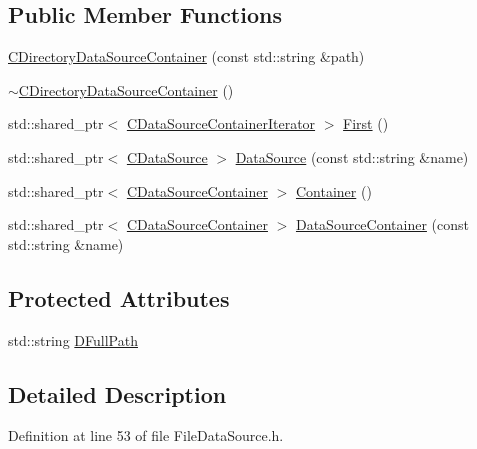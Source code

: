 \subsection*{Public Member Functions}
\begin{DoxyCompactItemize}
\item 
\hyperlink{classCDirectoryDataSourceContainer_a62ef6d44201c6be66421b6c247f3b3bf}{C\+Directory\+Data\+Source\+Container} (const std\+::string \&path)
\item 
\hyperlink{classCDirectoryDataSourceContainer_ae9768e5591ef7699903c0574063e19ad}{$\sim$\+C\+Directory\+Data\+Source\+Container} ()
\item 
std\+::shared\+\_\+ptr$<$ \hyperlink{classCDataSourceContainerIterator}{C\+Data\+Source\+Container\+Iterator} $>$ \hyperlink{classCDirectoryDataSourceContainer_a32aa8888dbf78f5a2a1ddb5324aad0cf}{First} ()
\item 
std\+::shared\+\_\+ptr$<$ \hyperlink{classCDataSource}{C\+Data\+Source} $>$ \hyperlink{classCDirectoryDataSourceContainer_ac925eec9c2c71654d0012bff92a462d4}{Data\+Source} (const std\+::string \&name)
\item 
std\+::shared\+\_\+ptr$<$ \hyperlink{classCDataSourceContainer}{C\+Data\+Source\+Container} $>$ \hyperlink{classCDirectoryDataSourceContainer_a5a498db9b312c223b0816fc6cc1fcd3d}{Container} ()
\item 
std\+::shared\+\_\+ptr$<$ \hyperlink{classCDataSourceContainer}{C\+Data\+Source\+Container} $>$ \hyperlink{classCDirectoryDataSourceContainer_a71291ab0a549056fc784f0c553a8dc39}{Data\+Source\+Container} (const std\+::string \&name)
\end{DoxyCompactItemize}
\subsection*{Protected Attributes}
\begin{DoxyCompactItemize}
\item 
std\+::string \hyperlink{classCDirectoryDataSourceContainer_ac3d3c7e7d7bc9f68ba8a8747a3dee8b5}{D\+Full\+Path}
\end{DoxyCompactItemize}


\subsection{Detailed Description}


Definition at line 53 of file File\+Data\+Source.\+h.



